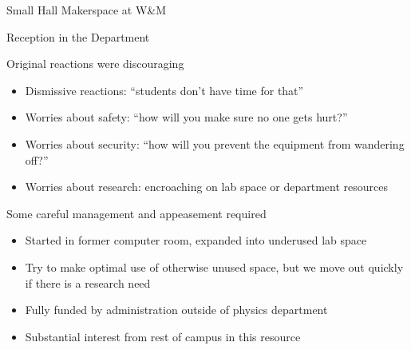 \documentclass[xcolor=table,compress,professionalfonts,pdfpagelabels]{beamer}
\begin{document}
\begin{frame}{Small Hall Makerspace at W\&M}
\end{frame}

\begin{frame}{Reception in the Department}
 \begin{block}{Original reactions were discouraging}
  \begin{itemize}
   \item Dismissive reactions: ``students don't have time for that''
   \item Worries about safety: ``how will you make sure no one gets hurt?''
   \item Worries about security: ``how will you prevent the equipment from wandering off?''
   \item Worries about research: encroaching on lab space or department resources
  \end{itemize}
 \end{block}
 \begin{block}{Some careful management and appeasement required}
  \begin{itemize}
   \item Started in former computer room, expanded into underused lab space
   \item Try to make optimal use of otherwise unused space, but we move out quickly if there is a research need
   \item Fully funded by administration outside of physics department
   \item Substantial interest from rest of campus in this resource
  \end{itemize}
 \end{block}
\end{frame}
 
\end{document}
